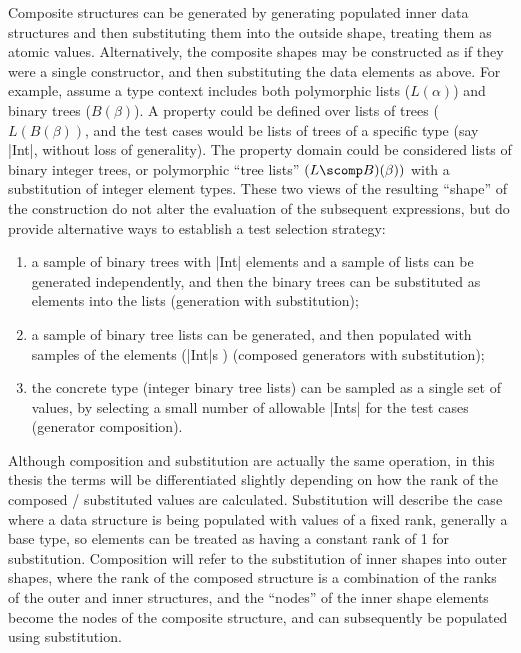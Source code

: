 
Composite structures can be generated by generating populated inner data structures
and then substituting them into the outside shape,
treating them as atomic values.
Alternatively,
the composite shapes may be constructed as if they were a single constructor,
and then substituting the data elements as above.
For example,
assume a type context includes both 
polymorphic lists ($L(\alpha)$) and binary trees ($B(\beta)$).
A property could be defined over lists of trees ($L (B(\beta)) $,
and the test cases would be lists of trees of a specific type 
(say |Int|, without loss of generality).
The property domain could be considered lists of binary integer trees,
or polymorphic ``tree lists'' $(L \scomp B)(\beta))$
with a substitution of integer element types.
These two views of the resulting ``shape'' of the construction
do not alter the evaluation of the subsequent expressions,
but do provide alternative ways to establish a test selection strategy:
\begin{enumerate}
\item a sample of binary trees with  |Int| elements
and a sample of lists can be generated independently,
and then the binary trees can be substituted as elements into the lists
(generation with substitution);
\item a sample of binary tree lists can be generated,
and then populated with samples of the elements (|Int|s )
(composed generators with substitution);
\item the concrete type (integer binary tree lists) can be sampled as a single set of values,
by selecting a small number of allowable |Ints| for the test cases
(generator composition).
\end{enumerate}


Although composition and substitution are actually the same operation,
in this thesis the terms will be differentiated slightly
depending on how the rank of the composed / substituted values are calculated.
Substitution will describe the case where 
a data structure is being populated with values of a fixed rank, 
generally a base type,
so elements can be treated as having a constant rank of 1 for substitution.
Composition will refer to the substitution of inner shapes into outer shapes,
where the rank of the composed structure is a combination of
the ranks of the outer and inner structures,
and the ``nodes'' of the inner shape elements become 
the nodes of the composite structure,
and can subsequently be populated using substitution.

